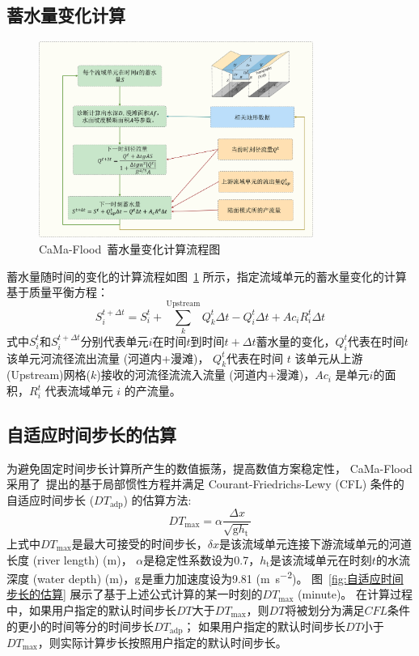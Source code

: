 \subsection{蓄水量变化计算}
{
  \begin{figure}[htbp]
    \centering
    \includegraphics[width=0.8\textwidth]{Figures/陆地表面的水分循环/蓄水量变化计算流程图.png}
    \caption{CaMa-Flood~蓄水量变化计算流程图 }
    \label{fig:蓄水量变化计算流程图}
  \end{figure}
}
蓄水量随时间的变化的计算流程如图~\ref{fig:蓄水量变化计算流程图} 所示，指定流域单元的蓄水量变化的计算基于质量平衡方程：
\begin{equation}
  S_{i}^{t+\Delta t}=S_{i}^{t}+\sum_{k}^{\text{Upstream}} Q_{k}^{t} \Delta t-Q_{i}^{t} \Delta t+A c_{i} R_{i}^{t} \Delta t
\end{equation}
式中$S_{i}^{t}$和$S_{i}^{t+\Delta t}$分别代表单元$i$在时间$t$到时间$t+\Delta t$蓄水量的变化，$Q_{i} ^t$代表在时间$t$该单元河流径流出流量 (河道内+漫滩)，
$Q_k^t$代表在时间 $t$ 该单元从上游(Upstream)网格($k$)接收的河流径流流入流量 (河道内+漫滩)，$Ac_i$ 是单元$i$的面积，$R_i^t$ 代表流域单元 $i$ 的产流量。


\subsection{自适应时间步长的估算}
为避免固定时间步长计算所产生的数值振荡，提高数值方案稳定性，
CaMa-Flood 采用了~\citet{bates2010}提出的基于局部惯性方程并满足 Courant-Friedrichs-Lewy (CFL)
条件的自适应时间步长 ($DT_{\mathrm{adp}}$) 的估算方法:
\begin{equation}
  {DT}_{\max }={\alpha} \frac{\Delta x}{\sqrt{{\mathrm {g}} h_{\mathrm{t}}}}
\end{equation}
上式中$DT_{\mathrm{max}}$是最大可接受的时间步长，$\delta{x}$是该流域单元连接下游流域单元的河道长度 (river length) (\unit{m})，
$\alpha$是稳定性系数设为0.7，$h_{\mathrm {t}} $是该流域单元在时刻$t$的水流深度 (water depth) (\unit{m})，$\rm g$是重力加速度设为9.81 (\unit{m.s^{-2}})。
图~\ref{fig:自适应时间步长的估算} 展示了基于上述公式计算的某一时刻的$DT_{\mathrm{max}}$ (minute)。
在计算过程中，如果用户指定的默认时间步长$DT$大于$DT_{\mathrm{max}}$，则$DT$将被划分为满足$CFL$条件的更小的时间等分的时间步长$DT_{\mathrm{adp}}$；
如果用户指定的默认时间步长$DT$小于$DT_{\mathrm{max}}$，则实际计算步长按照用户指定的默认时间步长。

